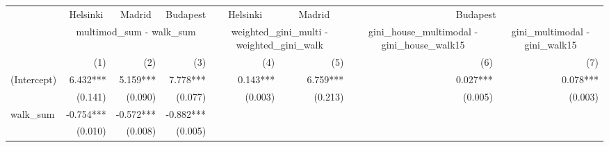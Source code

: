 \begin{tabular}{lrrrrrrr}
\toprule
                                           & \multicolumn{1}{c}{Helsinki} & \multicolumn{1}{c}{Madrid} & \multicolumn{1}{c}{Budapest} &   \multicolumn{1}{c}{Helsinki}   &   \multicolumn{1}{c}{Madrid}   &                                               \multicolumn{2}{c}{Budapest}                                              \\ 
\cmidrule(lr){2-2} \cmidrule(lr){3-3} \cmidrule(lr){4-4} \cmidrule(lr){5-5} \cmidrule(lr){6-6} \cmidrule(lr){7-8} 
                                           &                       \multicolumn{3}{c}{multimod\_sum - walk\_sum}                      &  \multicolumn{2}{c}{weighted\_gini\_multi - weighted\_gini\_walk} & \multicolumn{1}{c}{gini\_house\_multimodal - gini\_house\_walk15} & \multicolumn{1}{c}{gini\_multimodal - gini\_walk15} \\ 
\cmidrule(lr){2-4} \cmidrule(lr){5-6} \cmidrule(lr){7-7} \cmidrule(lr){8-8} 
                                           &                          (1) &                        (2) &                          (3) &                              (4) &                            (5) &                                                               (6) &                                                 (7) \\ 
\midrule
(Intercept)                                &                     6.432*** &                   5.159*** &                     7.778*** &                         0.143*** &                       6.759*** &                                                          0.027*** &                                            0.078*** \\ 
                                           &                      (0.141) &                    (0.090) &                      (0.077) &                          (0.003) &                        (0.213) &                                                           (0.005) &                                             (0.003) \\ 
walk\_sum                                  &                    -0.754*** &                  -0.572*** &                    -0.882*** &                                  &                                &                                                                   &                                                     \\ 
                                           &                      (0.010) &                    (0.008) &                      (0.005) &                                  &                                &                                                                   &                                                     \\ 

\end{tabular}
